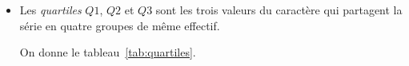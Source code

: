 \begin{defi}
\begin{itemize}
\begin{ex}
\begin{itemize}
\begin{table}[H]
\begin{tabular}{|c|c|c|}
                                                                  \hline
                                                                  \end{tabular}
                                                                  \caption{Notes d'un \'el\`eve en s\'erie scientifique.}
                                                                  \label{tab:notes}
                                                            \end{table}
                                                            
                                                            La moyenne est donc : 
                                                            $\displaystyle{
                                                                  \frac{  3 \cdot 14 + 2 \cdot 13 + 1 \cdot 14
                                                                        + \cdots
                                                                        + 4 \cdot 15 + 1 \cdot 08 }
                                                                       {3 + 2 + 1 + \cdots + 4 + 1}
                                                            }$
                                                            qui est \'egale \`a $13,57$.
                                                \end{itemize}
                                          \end{ex}
                                    \item Les \emph{quartiles} $Q1$, $Q2$ et $Q3$ sont les trois valeurs 
                                          du caract\`ere qui partagent la s\'erie en quatre groupes de m\^eme effectif.
                                          \begin{ex}
                                                On donne le tableau~\ref{tab:quartiles}.
                                                \begin{table}[H]

\end{table}
\end{ex}
\end{itemize}
\end{defi}
